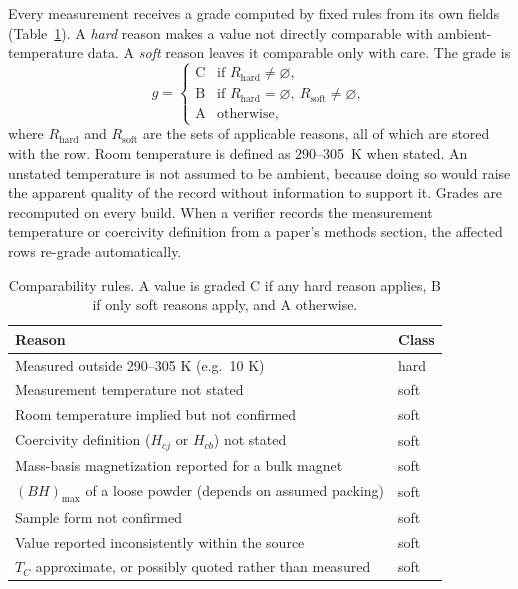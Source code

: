 \documentclass[10pt,twocolumn,letterpaper]{article}
\begin{document}
Every measurement receives a grade computed by fixed rules from its own fields (Table~\ref{tab:grade}). A \emph{hard} reason makes a value not directly comparable with ambient-temperature data. A \emph{soft} reason leaves it comparable only with care. The grade is
\begin{equation}
g=\begin{cases}
\text{C} & \text{if } R_{\text{hard}}\neq\varnothing,\\
\text{B} & \text{if } R_{\text{hard}}=\varnothing,\ R_{\text{soft}}\neq\varnothing,\\
\text{A} & \text{otherwise,}
\end{cases}
\end{equation}
where $R_{\text{hard}}$ and $R_{\text{soft}}$ are the sets of applicable reasons, all of which are stored with the row. Room temperature is defined as 290--305~K when stated. An unstated temperature is not assumed to be ambient, because doing so would raise the apparent quality of the record without information to support it. Grades are recomputed on every build. When a verifier records the measurement temperature or coercivity definition from a paper's methods section, the affected rows re-grade automatically.

\begin{table}[t]
\caption{Comparability rules. A value is graded C if any hard reason applies, B if only soft reasons apply, and A otherwise.}
\label{tab:grade}
\small
\begin{tabular}{@{}p{}l@{}}
\toprule
Reason & Class \\
\midrule
Measured outside 290--305 K (e.g.\ 10 K) & hard \\
Measurement temperature not stated & soft \\
Room temperature implied but not confirmed & soft \\
Coercivity definition ($H_{cj}$ or $H_{cb}$) not stated & soft \\
Mass-basis magnetization reported for a bulk magnet & soft \\
$(BH)_{\max}$ of a loose powder (depends on assumed packing) & soft \\
Sample form not confirmed & soft \\
Value reported inconsistently within the source & soft \\
$T_C$ approximate, or possibly quoted rather than measured & soft \\
\bottomrule
\end{tabular}
\end{table}
\end{document}
